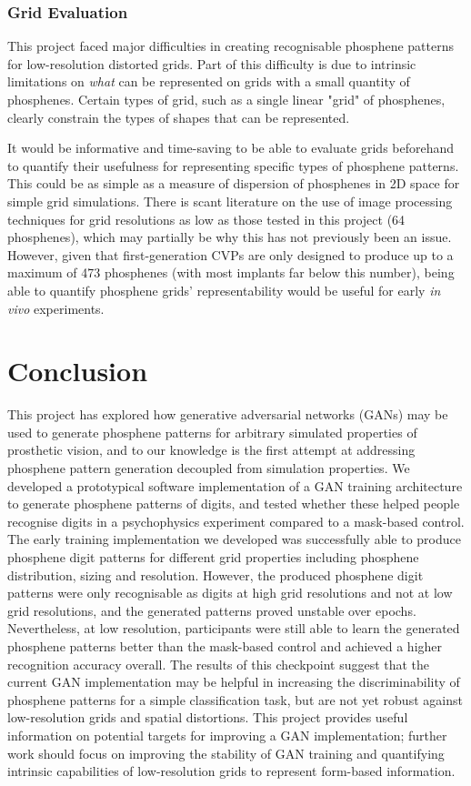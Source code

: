 \documentclass[a4paper,11pt,openany]{book}
\begin{document}
\section*{Grid Evaluation}
\label{sec:org8750e9c}

This project faced major difficulties in creating recognisable phosphene patterns for low-resolution distorted grids.
Part of this difficulty is due to intrinsic limitations on \emph{what} can be represented on grids with a small quantity of phosphenes.
Certain types of grid, such as a single linear "grid" of phosphenes, clearly constrain the types of shapes that can be represented.

It would be informative and time-saving to be able to evaluate grids beforehand to quantify their usefulness for representing specific types of phosphene patterns.
This could be as simple as a measure of dispersion of phosphenes in 2D space for simple grid simulations.
There is scant literature on the use of image processing techniques for grid resolutions as low as those tested in this project (64 phosphenes), which may partially be why this has not previously been an issue.
However, given that first-generation CVPs are only designed to produce up to a maximum of 473 phosphenes (with most implants far below this number), being able to quantify phosphene grids' representability would be useful for early \emph{in vivo} experiments.

\part{Conclusion}
\label{sec:org75550c3}

This project has explored how generative adversarial networks (GANs) may be used to generate phosphene patterns for arbitrary simulated properties of prosthetic vision, and to our knowledge is the first attempt at addressing phosphene pattern generation decoupled from simulation properties. 
We developed a prototypical software implementation of a GAN training architecture to generate phosphene patterns of digits, and tested whether these helped people recognise digits in a psychophysics experiment compared to a mask-based control.
The early training implementation we developed was successfully able to produce phosphene digit patterns for different grid properties including phosphene distribution, sizing and resolution.
However, the produced phosphene digit patterns were only recognisable as digits at high grid resolutions and not at low grid resolutions, and the generated patterns proved unstable over epochs.
Nevertheless, at low resolution, participants were still able to learn the generated phosphene patterns better than the mask-based control and achieved a higher recognition accuracy overall.
The results of this checkpoint suggest that the current GAN implementation may be helpful in increasing the discriminability of phosphene patterns for a simple classification task, but are not yet robust against low-resolution grids and spatial distortions.
This project provides useful information on potential targets for improving a GAN implementation; further work should focus on improving the stability of GAN training and quantifying intrinsic capabilities of low-resolution grids to represent form-based information.
\end{document}
